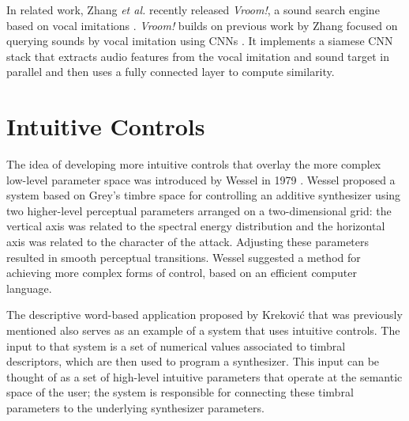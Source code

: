 
In related work, Zhang \textit{et al.} recently released \textit{Vroom!}, a sound search engine based on vocal imitations \cite{zhang2020vroom}. \textit{Vroom!} builds on previous work by Zhang focused on querying sounds by vocal imitation using CNNs \cite{zhang2017iminet, zhang2018visualization}. It implements a siamese CNN stack that extracts audio features from the vocal imitation and sound target in parallel and then uses a fully connected layer to compute similarity.

\section{Intuitive Controls}
The idea of developing more intuitive controls that overlay the more complex low-level parameter space was introduced by Wessel in 1979 \cite{wessel1979timbre}. Wessel proposed a system based on Grey's timbre space \cite{grey1977multidimensional} for controlling an additive synthesizer using two higher-level perceptual parameters arranged on a two-dimensional grid: the vertical axis was related to the spectral energy distribution and the horizontal axis was related to the character of the attack. Adjusting these parameters resulted in smooth perceptual transitions. Wessel suggested a method for achieving more complex forms of control, based on an efficient computer language.

The descriptive word-based application proposed by Krekovi\'{c} that was previously mentioned \cite{krekovic2016algorithm} also serves as an example of a system that uses intuitive controls. The input to that system is a set of numerical values associated to timbral descriptors, which are then used to program a synthesizer. This input can be thought of as a set of high-level intuitive parameters that operate at the semantic space of the user; the system is responsible for connecting these timbral parameters to the underlying synthesizer parameters.

